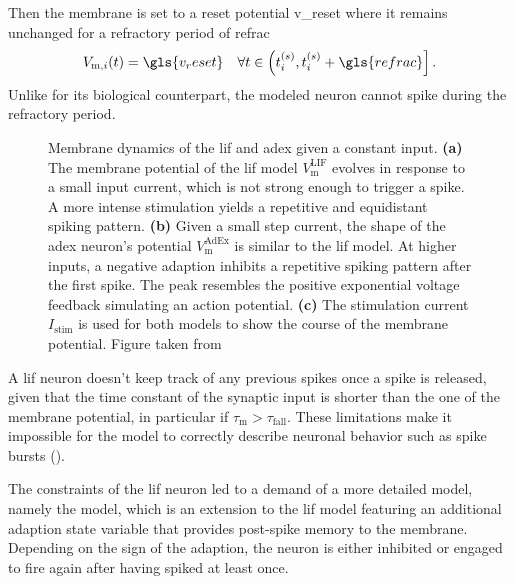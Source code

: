 Then the membrane is set to a reset potential \gls{v_reset} where it remains unchanged for a refractory period of \gls{refrac}
\begin{equation*}
V_{\text{m}, i}(t) = \gls{v_reset} \quad \forall t \in \left(t_i^{(s)}, t_i^{(s)} + \gls{refrac}\right].
\end{equation*}
Unlike for its biological counterpart, the modeled neuron cannot spike during the refractory period.

\begin{figure}
	\centering
	\scalebox{0.93}{}
	\caption[Membrane dynamics of the \gls{lif} and \gls{adex} given a constant input.]{Membrane dynamics of the \gls{lif} and \gls{adex} given a constant input. \textbf{(a)} The membrane potential of the \gls{lif} model $V_\text{m}^\text{LIF}$ evolves in response to a small input current, which is not strong enough to trigger a spike. A more intense stimulation yields a repetitive and equidistant spiking pattern. \textbf{(b)} Given a small step current, the shape of the \gls{adex} neuron's potential $V_\text{m}^\text{AdEx}$ is similar to the \gls{lif} model. At higher inputs, a negative adaption inhibits a repetitive spiking pattern after the first spike. The peak resembles the positive exponential voltage feedback simulating an action potential. \textbf{(c)} The stimulation current $I_\text{stim}$ is used for both models to show the course of the membrane potential. Figure taken from \citealp{stradmann2019msc}}
	\label{lifvsadex}
\end{figure}

A \gls{lif} neuron doesn't keep track of any previous spikes once a spike is released, given that the time constant of the synaptic input is shorter than the one of the membrane potential, in particular if $\tau_\text{m} > \tau_\text{fall}$. These limitations make it impossible for the model to correctly describe neuronal behavior such as spike bursts (\citealp{gerstner2014dynamics}).

The constraints of the \gls{lif} neuron led to a demand of a more detailed model, namely the  model, which is an extension to the \gls{lif} model featuring an additional adaption state variable that provides post-spike memory to the membrane. Depending on the sign of the adaption, the neuron is either inhibited or engaged to fire again after having spiked at least once.



